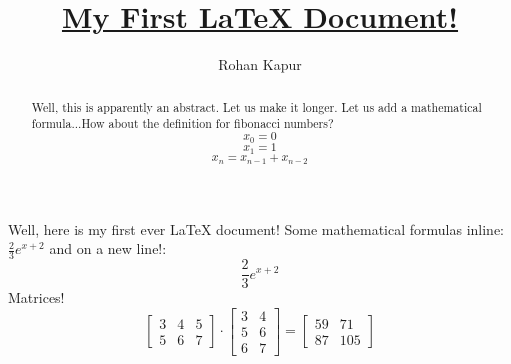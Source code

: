 \documentclass[letterpaper,12pt]{article}
\title{\underline{My First \LaTeX{} Document!}}
\author{Rohan Kapur}
\begin{document}
\maketitle
\begin{abstract}
  Well, this is apparently an abstract. Let us make it longer. Let us add a mathematical formula...How about the definition for fibonacci numbers?
  \[x_{0} = 0\]
  \[x_{1} = 1\]
  \[x_{n} = x_{n-1} + x_{n-2}\]
\end{abstract}
Well, here is my first ever LaTeX document! Some mathematical formulas inline: \(\frac{2}{3}e^{x+2}\) and on a new line!:
\[\frac{2}{3}e^{x+2}\]
Matrices!
\[
\begin{bmatrix}
  3 & 4 & 5 \\
  5 & 6 & 7
\end{bmatrix}
\cdot
\begin{bmatrix}
  3 & 4 \\
  5 & 6 \\
  6 & 7
\end{bmatrix}
=
\begin{bmatrix}
  59 & 71 \\
  87 & 105
\end{bmatrix}
\]
\end{document}
